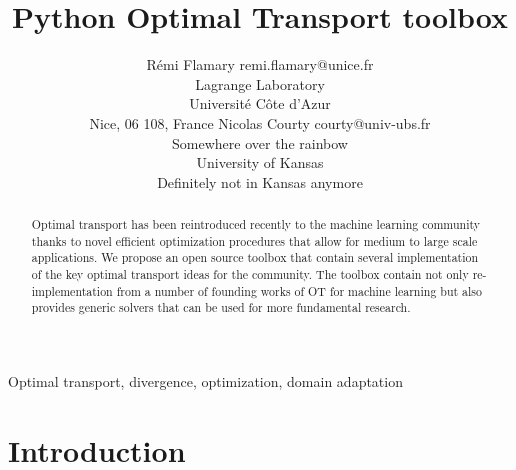 \documentclass[twoside,11pt]{article}
\begin{document}
\title{Python Optimal Transport toolbox}

\author{\name Rémi Flamary \email remi.flamary@unice.fr \\
       \addr Lagrange Laboratory\\
       Université Côte d'Azur\\
       Nice, 06 108, France
       \AND
       \name Nicolas Courty \email courty@univ-ubs.fr \\
       \addr Somewhere over the rainbow\\
       University of Kansas\\
       Definitely not in Kansas anymore}

\editor{}

\maketitle

\begin{abstract}%
Optimal transport has been reintroduced recently to the machine
learning community thanks to novel efficient optimization procedures that
allow for medium to large scale applications. We propose an open source
toolbox that contain several implementation of the key optimal
transport ideas for the community. The toolbox contain not only
re-implementation from a number of founding works of OT for machine
learning but also provides generic solvers that can be used for more
fundamental research.
\end{abstract}

\begin{keywords}
  Optimal transport, divergence, optimization, domain adaptation
\end{keywords}

\section{Introduction}






\newpage







\vskip 0.2in

\end{document}
